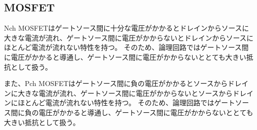 \subsection{MOSFET}
Nch MOSFETはゲートソース間に十分な電圧がかかるとドレインからソースに大きな電流が流れ、ゲートソース間に電圧がかからないとドレインからソースにほとんど電流が流れない特性を持つ。
そのため、論理回路ではゲートソース間に電圧がかかると導通し、ゲートソース間に電圧がかからないととても大きい抵抗として扱う。

また、Pch MOSFETはゲートソース間に負の電圧がかかるとソースからドレインに大きな電流が流れ、ゲートソース間に電圧がかからないとソースからドレインにほとんど電流が流れない特性を持つ。
そのため、論理回路ではゲートソース間に負の電圧がかかると導通し、ゲートソース間に電圧がかからないととても大きい抵抗として扱う。